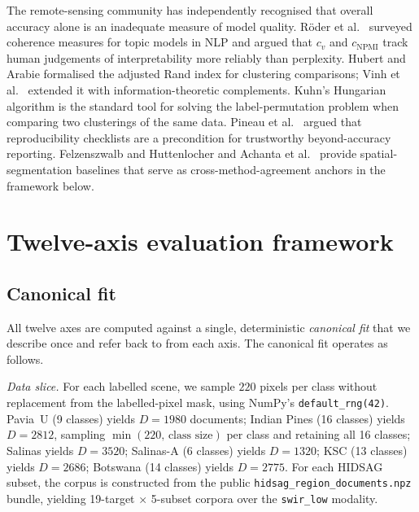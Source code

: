 \documentclass[journal,a4paper,10pt]{IEEEtran}
\begin{document}
The remote-sensing community has independently recognised that overall
accuracy alone is an inadequate measure of model quality. Röder et
al.\ \cite{roder2015exploring} surveyed coherence measures for topic
models in NLP and argued that $c_v$ and $c_{\text{NPMI}}$ track human
judgements of interpretability more reliably than perplexity. Hubert
and Arabie \cite{hubert1985ari} formalised the adjusted Rand index for
clustering comparisons; Vinh et al.\ \cite{vinh2010information}
extended it with information-theoretic complements. Kuhn's Hungarian
algorithm \cite{kuhn1955hungarian} is the standard tool for solving
the label-permutation problem when comparing two clusterings of the
same data. Pineau et al.\ \cite{pineau2021nature} argued that
reproducibility checklists are a precondition for trustworthy
beyond-accuracy reporting. Felzenszwalb and Huttenlocher
\cite{felzenszwalb2004efficient} and Achanta et al.\
\cite{achanta2012slic} provide spatial-segmentation baselines that
serve as cross-method-agreement anchors in the framework below.

\section{Twelve-axis evaluation framework}
\label{sec:framework}

\subsection{Canonical fit}
\label{subsec:canonical}

All twelve axes are computed against a single, deterministic
\emph{canonical fit} that we describe once and refer back to from each
axis. The canonical fit operates as follows.

\emph{Data slice.} For each labelled scene, we sample $220$ pixels
per class without replacement from the labelled-pixel mask, using
NumPy's \texttt{default\_rng(42)}. Pavia~U (9 classes) yields
$D = 1980$ documents; Indian Pines (16 classes) yields
$D = 2812$, sampling $\min(220,\,\text{class size})$ per class and retaining all 16 classes; Salinas
yields $D = 3520$; Salinas-A (6 classes) yields $D = 1320$; KSC
(13 classes) yields $D = 2686$; Botswana (14 classes) yields
$D = 2775$. For each HIDSAG subset, the corpus is constructed
from the public \texttt{hidsag\_region\_documents.npz} bundle,
yielding 19-target × 5-subset corpora over the \texttt{swir\_low}
modality.
\end{document}
